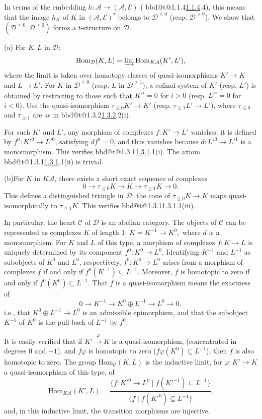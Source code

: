 \documentclass[12pt,oneside]{amsbook}
\makeatletter
\DeclareRobustCommand{\rn}[1]{%
  \ifcsname bbd@t@#1\endcsname\hyperlink{bbd:#1}{#1}\else#1\fi}
\theoremstyle{plain}
\theoremstyle{definition}
\makeatother
\begin{document}
In terms of the embedding $h : \mathcal{A} \to (\mathcal{A}, \mathcal{E})$ (\rn{1.1.4}), this means that the image $h_K$ of $K$ in $(\mathcal{A}, \mathcal{E})^\tau$ belongs to $\mathcal{D}^{\le 0}$ (resp. $\mathcal{D}^{\ge 0}$). We show that $(\mathcal{D}^{\le 0}, \mathcal{D}^{\ge 0})$ forms a $t$-structure on $\mathcal{D}$.

(a) For $K, L$ in $\mathcal{D}$:
    \[\mathrm{Hom}_\mathcal{D}(K, L) = \varinjlim \mathrm{Hom}_{K\mathcal{A}}(K', L'),
    \]
where the limit is taken over homotopy classes of quasi-isomorphisms $K' \to K$ and $L \to L'$. For $K$ in $\mathcal{D}^{\le 0}$ (resp. $L$ in $\mathcal{D}^{\ge 1}$), a cofinal system of $K'$ (resp. $L'$) is obtained by restricting to those such that $K'^i = 0$ for $i > 0$ (resp. $L'^i = 0$ for $i < 0$). Use the quasi-isomorphism $\tau_{\le 0}K' \to K'$ (resp. $\tau_{\ge 1}L' \to L'$), where $\tau_{\le 0}$ and $\tau_{\ge 1}$ are as in \rn{1.3.2}(i).

For such $K'$ and $L'$, any morphism of complexes $f: K' \to L'$ vanishes: it is defined by $f^0: K'^0 \to L'^0$, satisfying $df^0 = 0$, and thus vanishes because $d: L'^0 \to L'^1$ is a monomorphism. This verifies \rn{1.3.1}(i). The axiom \rn{1.3.1}(ii) is trivial.

(b)For $K$ in $K\mathcal{A}$, there exists a short exact sequence of complexes
    \[
    0 \to \tau_{\le 0}K \to K \to \tau_{\ge 1}K \to 0.
    \]
This defines a distinguished triangle in $\mathcal{D}$: the cone of $\tau_{\le 0}K \to K$ maps quasi-isomorphically to $\tau_{\ge 1}K$. This verifies \rn{1.3.1}(iii).

In particular, the heart $\mathcal{C}$ of $\mathcal{D}$ is an abelian category. The objects of $\mathcal{C}$ can be represented as complexes $K$ of length 1: \( K = K^{-1} \to K^0, \) where $d$ is a monomorphism. For $K$ and $L$ of this type, a morphism of complexes $f: K \to L$ is uniquely determined by its component $f^0: K^0 \to L^0$. Identifying $K^{-1}$ and $L^{-1}$ as subobjects of $K^0$ and $L^0$, respectively, $f^0: K^0 \to L^0$ arises from a morphism of complexes $f$ if and only if $f^0(K^{-1}) \subseteq L^{-1}$. Moreover, $f$ is homotopic to zero if and only if $f^0(K^0) \subseteq L^{-1}$. That $f$ is a quasi-isomorphism means the exactness of
\[
0 \to K^{-1} \to K^0 \oplus L^{-1} \to L^0 \to 0,
\]
i.e., that $K^0 \oplus L^{-1} \to L^0$ is an admissible epimorphism, and that the subobject $K^{-1}$ of $K^0$ is the pull-back of $L^{-1}$ by $f^0$.

It is easily verified that if $K' \overset{\varphi}\to K$ is a quasi-isomorphism, (concentrated in degrees $0$ and $-1$), and $f\varphi$ is homotopic to zero ($f\varphi(K^0) \subseteq L^{-1}$), then $f$ is also homotopic to zero. The group $\mathrm{Hom}_{\mathcal{C}}(K, L)$ is the inductive limit, for $\varphi : K' \to K$ a quasi-isomorphism of this type, of
\[
\mathrm{Hom}_{K\mathcal{A}}(K', L) =
\frac{\{f : K'^0 \to L^0 \mid f(K'^{-1}) \subseteq L^{-1}\}}
     {\{f \mid f(K'^0) \subseteq L^{-1}\}}.
\]
and, in this inductive limit, the transition morphisms are injective.
\end{document}
